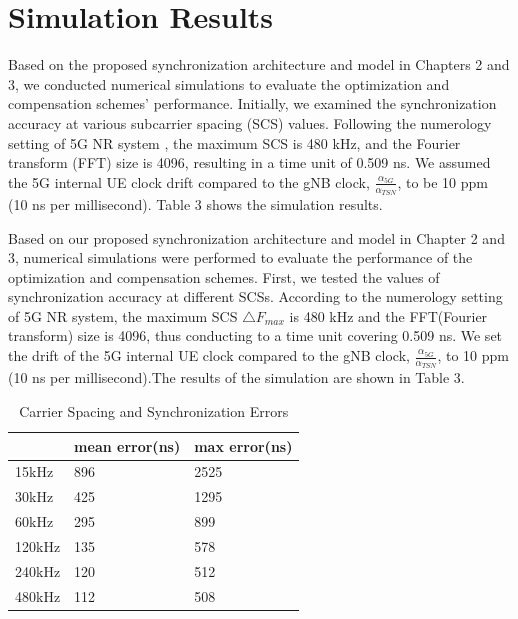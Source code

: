 \documentclass[english]{cccconf}
\begin{document}
\section{Simulation Results}
Based on the proposed synchronization architecture and model in Chapters 2 and 3, we conducted numerical simulations to evaluate the optimization and compensation schemes' performance. Initially, we examined the synchronization accuracy at various subcarrier spacing (SCS) values. Following the numerology setting of 5G NR system \cite{access2015requirements}, the maximum SCS is 480 kHz, and the Fourier transform (FFT) size is 4096, resulting in a time unit of 0.509 ns. We assumed the 5G internal UE clock drift compared to the gNB clock, $\frac{\alpha_{5G}}{\alpha_{TSN}}$, to be 10 ppm (10 ns per millisecond). Table 3 shows the simulation results.

Based on our proposed synchronization architecture and model in Chapter 2 and 3, numerical simulations were performed to evaluate the performance of the optimization and compensation schemes. First, we tested the values of synchronization accuracy at different SCSs. According to the numerology setting of 5G NR system\cite{access2015requirements}, the maximum SCS $\triangle F_{max}$ is 480 kHz and the FFT(Fourier transform) size is 4096, thus conducting to a time unit covering 0.509 ns. We set the drift of the 5G internal UE clock compared to the gNB clock, $\frac{\alpha_{5G}}{\alpha_{TSN}}$, to 10 ppm (10 ns per millisecond).The results of the simulation are shown in Table 3.
\begin{table}[!htb]
	\centering
	\caption{Carrier Spacing and Synchronization Errors}
	\label{tab1}
	\begin{tabular}{l|l|l}
		\hline
		 & \textbf{mean error(ns)}& \textbf{max error(ns)} \\
		\hline
		15kHz 
		& 896
		& 2525 \\
		\hline
		30kHz
		& 425
		& 1295 \\
		\hline
		60kHz
		& 295
		& 899 \\
		\hline
		120kHz
		& 135
		& 578 \\
		\hline
		240kHz
		& 120
		& 512 \\
		\hline
			480kHz
		& 112
		& 508 \\
		\hline
	\end{tabular}
\end{table}
\end{document}

